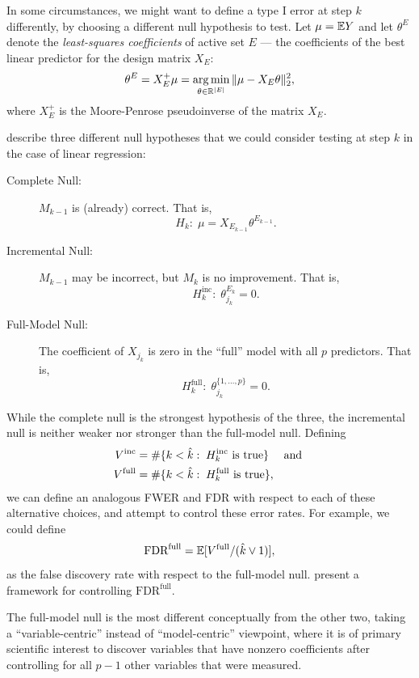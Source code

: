 \documentclass{article}
\begin{document}
In some circumstances, we might want to define a type I error at step $k$ differently, by choosing a different null hypothesis to test. Let $\mu = \mathbb{E} Y$ and let $\theta^E$ denote the {\em least-squares coefficients} of active set $E$ --- the coefficients of the best linear predictor for the design matrix $X_E$:
\[
\theta^E = X_E^+ \mu = \operatorname*{arg\,min}_{\theta\in \mathbb{R}^{|E|}} \|\mu - X_E\theta\|_2^2,
\]
where $X_E^+$ is the Moore-Penrose pseudoinverse of the matrix $X_E$. 

\citet{gsell2013sequential} describe three different null hypotheses that we could consider testing at step $k$ in the case of linear regression:
\begin{description}
\item[Complete Null:] $M_{k-1}$ is (already) correct. That is, 
\[
H_k:\;\mu = X_{E_{k-1}} \theta^{E_{k-1}}.
\]
\item[Incremental Null:] $M_{k-1}$ may be incorrect, but $M_k$ is no improvement. That is, 
\[
H_k^{\text{inc}}:\; \theta_{j_k}^{E_k} = 0.
\]
\item[Full-Model Null:] The coefficient of $X_{j_k}$ is zero in the ``full'' model with all $p$ predictors. That is,
\[
H_k^{\text{full}}:\; \theta_{j_k}^{\{1,\ldots,p\}} = 0.
\]
\end{description}

While the complete null is the strongest hypothesis of the three, the incremental null is neither weaker nor stronger than the full-model null. Defining 
\begin{align}
V^{\text{inc}} &= \#\{k < \hat{k}:\; H_k^{\text{inc}} \text{ is true}\} \quad \text{ and } \\
V^{\text{full}} &= \#\{k < \hat{k}:\; H_k^{\text{full}} \text{ is true}\},
\end{align}
we can define an analogous FWER and FDR with respect to each of these alternative choices, and attempt to control these error rates. For example, we could define
\[
\text{FDR}^{\text{full}} = \mathbb{E}[V^{\text{full}} / (\hat{k} \vee 1)],
\]
as the false discovery rate with respect to the full-model null. \citet{barber2014controlling} present a framework for controlling $\text{FDR}^{\text{full}}$. 

The full-model null is the most different conceptually from the other two, taking a ``variable-centric'' instead of ``model-centric'' viewpoint, where it is of primary scientific interest to discover variables that have nonzero coefficients after controlling for all $p-1$ other variables that were measured.
\end{document}
